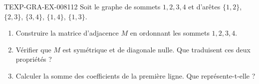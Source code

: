 \begin{exercice}{TEXP-GRA-EX-008}{1}{12}
Soit le graphe de sommets $1,2,3,4$ et d'arêtes $\{1,2\}$, $\{2,3\}$,
$\{3,4\}$, $\{1,4\}$, $\{1,3\}$.
\begin{enumerate}
  \item Construire la matrice d'adjacence $M$ en ordonnant les sommets
        $1,2,3,4$.
  \item Vérifier que $M$ est symétrique et de diagonale nulle. Que traduisent
        ces deux propriétés ?
  \item Calculer la somme des coefficients de la première ligne. Que
        représente-t-elle ?
\end{enumerate}
\end{exercice}

